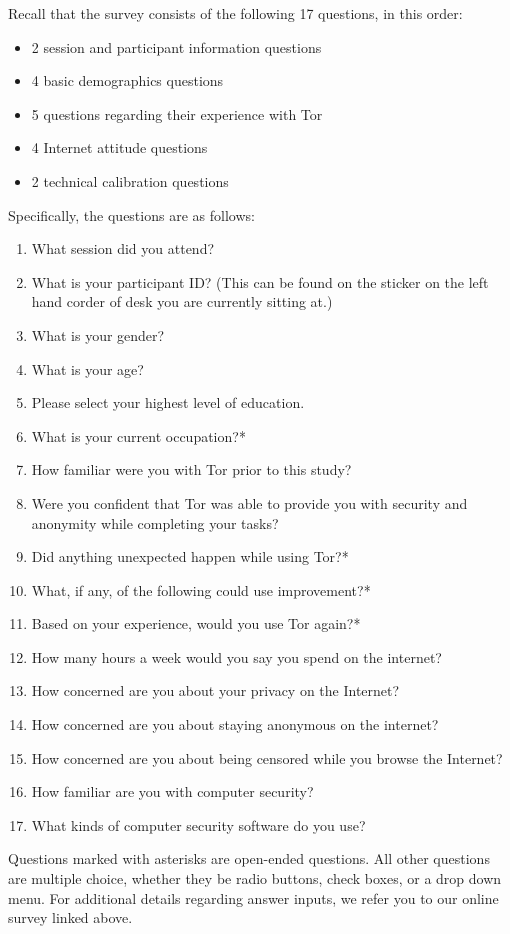 \documentclass[letterpaper,twocolumn,11pt]{article}
\begin{document}
\noindent Recall that the survey consists of the following 17 questions, in this order: 
\begin{itemize} \itemsep1pt \parskip0pt 
\item 2 session and participant information questions
\item 4 basic demographics questions
\item 5 questions regarding their experience with Tor
\item 4 Internet attitude questions
\item 2 technical calibration questions
\end{itemize}

\noindent Specifically, the questions are as follows: 
\begin{enumerate} \itemsep1pt \parskip0pt 
\item What session did you attend?  
\item What is your participant ID? (This can be found on the sticker on the left hand corder of desk you are currently sitting at.) 
\item What is your gender? 
\item What is your age? 
\item Please select your highest level of education. 
\item What is your current occupation?*
\item How familiar were you with Tor prior to this study? 
\item Were you confident that Tor was able to provide you with security and anonymity while completing your tasks?
\item Did anything unexpected happen while using Tor?*
\item What, if any, of the following could use improvement?*
\item Based on your experience, would you use Tor again?*
\item How many hours a week would you say you spend on the internet? 
\item How concerned are you about your privacy on the Internet?
\item How concerned are you about staying anonymous on the internet?
\item How concerned are you about being censored while you browse the Internet? 
\item How familiar are you with computer security? 
\item What kinds of computer security software do you use? 
\end{enumerate}

Questions marked with asterisks are open-ended questions. All other questions are multiple choice, whether they be radio buttons, check boxes, or a drop down menu. For additional details regarding answer inputs, we refer you to our online survey linked above. 


 
\end{document}
